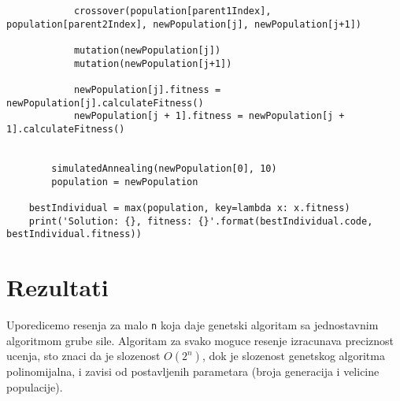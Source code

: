 \documentclass[11pt]{article} %
\begin{document}
\begin{lstlisting}
            crossover(population[parent1Index], population[parent2Index], newPopulation[j], newPopulation[j+1])

            mutation(newPopulation[j])
            mutation(newPopulation[j+1])

            newPopulation[j].fitness = newPopulation[j].calculateFitness()
            newPopulation[j + 1].fitness = newPopulation[j + 1].calculateFitness()


        simulatedAnnealing(newPopulation[0], 10)
        population = newPopulation

    bestIndividual = max(population, key=lambda x: x.fitness)
    print('Solution: {}, fitness: {}'.format(bestIndividual.code, bestIndividual.fitness))
\end{lstlisting}

\section{Rezultati}
Uporedicemo resenja za malo \lstinline{n} koja daje genetski algoritam sa jednostavnim algoritmom grube sile. Algoritam za svako moguce resenje izracunava preciznost ucenja, sto znaci da je slozenost \( O(2^n) \), dok je slozenost genetskog algoritma polinomijalna, i zavisi od postavljenih parametara (broja generacija i velicine populacije).
\newline\newline
\end{document}
